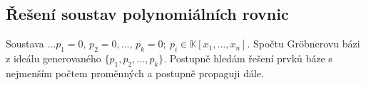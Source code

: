 \subsection*{Řešení soustav polynomiálních rovnic}
Soustava $\dots p_1=0,\,p_2=0,\dots,\,p_k=0;\ p_i \in \mathbb{K}[x_1,\dots,x_n]$. Spočtu Gröbnerovu bázi z ideálu generovaného $\{p_1,p_2,\dots,p_k\}$. Postupně hledám řešení prvků báze s nejmenším počtem proměnných a postupně propaguji dále.
